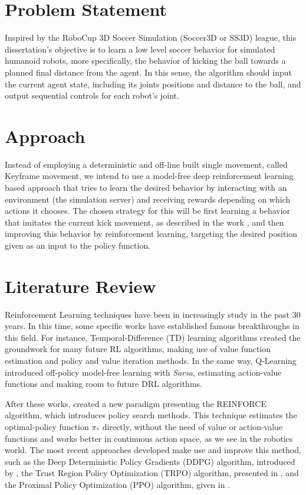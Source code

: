 \section{Problem Statement}

Inspired by the RoboCup 3D Soccer Simulation (Soccer3D or SS3D) league, this dissertation's objective is to learn a low level soccer behavior for simulated humanoid robots, more specifically, the behavior of kicking the ball towards a planned final distance from the agent. In this sense, the algorithm should input the current agent state, including its joints positions and distance to the ball, and output sequential controls for each robot's joint.

\section{Approach}

Instead of employing a deterministic and off-line built single movement, called Keyframe movement, we intend to use a model-free deep reinforcement learning based approach that tries to learn the desired behavior by interacting with an environment (the simulation server) and receiving rewards depending on which actions it chooses.
The chosen strategy for this will be first learning a behavior that imitates the current kick movement, as described in the work \cite{deepmimic}, and then improving this behavior by reinforcement learning, targeting the desired position given as an input to the policy function.

\section{Literature Review}

Reinforcement Learning techniques have been in increasingly study in the past 30 years. In this time, some specific works have established  famous breakthroughs in this field. For instance, Temporal-Difference (TD) learning algorithms \cite{TDLearning} created the groundwork for many future RL algorithms, making use of value function estimation and policy and value iteration methods. In the same way, Q-Learning \cite{QLearning} introduced off-policy model-free learning with \textit{Sarsa}, estimating action-value functions and making room to future DRL algorithms.

After these works,  created a new paradigm presenting the REINFORCE algorithm, which introduces policy search methods. This technique estimates the optimal-policy function $\pi_*$ directly, without the need of value or action-value functions and works better in continuous action space, as we see in the robotics world. The most recent approaches developed make use and improve this method, such as the Deep Deterministic Policy Gradients (DDPG) algorithm, introduced by \cite{DDPG}, the Trust Region Policy Optimization (TRPO) algorithm, presented in \cite{TRPO}, and the Proximal Policy Optimization (PPO) algorithm, given in \cite{PPO}.

